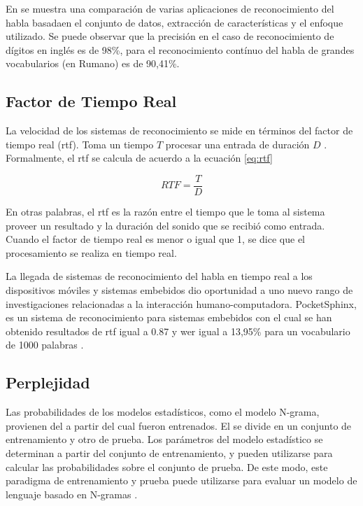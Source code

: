 En \cite{VimalaReview2012} se muestra una comparaci\'on de varias aplicaciones de reconocimiento del habla 
basadaen el conjunto de datos, extracci\'on de caracter\'isticas y el enfoque utilizado. Se puede observar
que la precisi\'on en el caso de reconocimiento de d\'igitos en ingl\'es es de 98\%, 
para el reconocimiento cont\'inuo del habla de grandes vocabularios (en Rumano) es de 90,41\%.

\subsection{Factor de Tiempo Real}
\label{sec:rtf}

La velocidad de los sistemas de reconocimiento se mide en t\'erminos del factor de tiempo real (\gls{rtf}). 
Toma un tiempo $T$ procesar una entrada de duraci\'on $D$ \cite{VimalaReview2012}. 
Formalmente, el \gls{rtf} se calcula de acuerdo a la ecuaci\'on \eqref{eq:rtf}

\begin{equation}
\label{eq:rtf}
    RTF = \frac{T}{D}
\end{equation}

En otras palabras, el \gls{rtf} es la razón entre el tiempo que le toma al sistema proveer un resultado y la
duración del sonido que se recibió como entrada. Cuando el factor de tiempo real es menor o igual que 1, 
se dice que el procesamiento se realiza en tiempo real.

La llegada de sistemas de reconocimiento del habla en tiempo real a los dispositivos m\'oviles y sistemas
embebidos dio oportunidad a uno nuevo rango de investigaciones relacionadas a la interacci\'on 
humano-computadora. PocketSphinx, es un sistema de reconocimiento para sistemas embebidos con el cual 
se han obtenido resultados de \gls{rtf} igual a 0.87 y \gls{wer} igual a 13,95\% para un vocabulario de 1000 palabras \cite{HugginsDainesPocketSphinx2006}.

\subsection{Perplejidad}
\label{sec:perplexity}

Las probabilidades de los modelos estad\'isticos, como el modelo N-grama, provienen del 
 a partir del cual fueron entrenados. El  se divide en un conjunto
de entrenamiento y otro de prueba.
Los par\'ametros del modelo estad\'istico se determinan a partir del conjunto de entrenamiento, 
y pueden utilizarse para calcular las probabilidades sobre el conjunto de prueba. 
De este modo, este paradigma de entrenamiento y prueba puede utilizarse para evaluar un modelo de 
lenguaje basado en N-gramas \cite{Jurafsky}.

